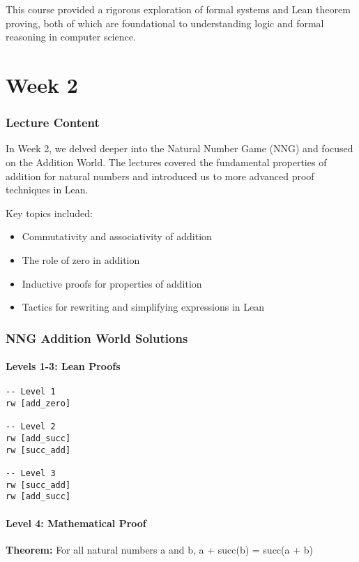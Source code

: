 \documentclass{article}
\theoremstyle{theorem}
\theoremstyle{definition}
\theoremstyle{remark}
\begin{document}
This course provided a rigorous exploration of formal systems and Lean theorem proving, both of which are foundational to understanding logic and formal reasoning in computer science.

\section{Week 2}

\subsubsection{Lecture Content}

In Week 2, we delved deeper into the Natural Number Game (NNG) and focused on the Addition World. The lectures covered the fundamental properties of addition for natural numbers and introduced us to more advanced proof techniques in Lean.

Key topics included:
\begin{itemize}
    \item Commutativity and associativity of addition
    \item The role of zero in addition
    \item Inductive proofs for properties of addition
    \item Tactics for rewriting and simplifying expressions in Lean
\end{itemize}

\subsubsection{NNG Addition World Solutions}

\paragraph{Levels 1-3: Lean Proofs}

\begin{lstlisting}
-- Level 1
rw [add_zero]

-- Level 2
rw [add_succ]
rw [succ_add]

-- Level 3
rw [succ_add]
rw [add_succ]
\end{lstlisting}

\paragraph{Level 4: Mathematical Proof}

\textbf{Theorem:} For all natural numbers a and b, a + succ(b) = succ(a + b)
\end{document}
